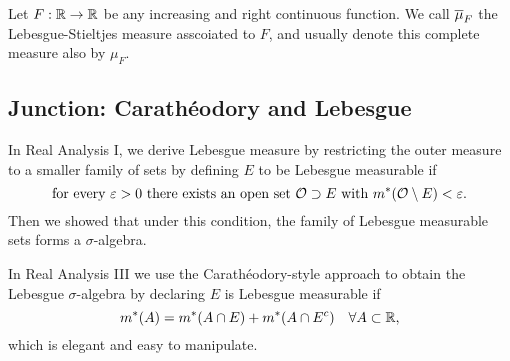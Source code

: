 \begin{definition}
    Let $F: \mathbb{R} \to \mathbb{R}$ be any increasing and right continuous function. We call $\overline{\mu}_F$ the Lebesgue-Stieltjes measure asscoiated to $F$, and usually denote this complete measure also by $\mu_F$. 
\end{definition}


\subsection{Junction: Carath\'eodory and Lebesgue}
In Real Analysis I, we derive Lebesgue measure by restricting the outer measure to a smaller family of sets by defining $E$ to be Lebesgue measurable if 
$$\text{for every }\varepsilon>0 \text{ there exists an open set }\mathcal{O} \supset E \text{ with }m^*(\mathcal{O} \setminus E) < \varepsilon.$$
Then we showed that under this condition, the family of Lebesgue measurable sets forms a $\sigma$-algebra. 

In Real Analysis III we use the Carath\'eodory-style approach to obtain the Lebesgue $\sigma$-algebra by declaring $E$ is Lebesgue measurable if 
$$m^*(A) = m^*(A \cap E) + m^*(A \cap E^c) \quad \forall A \subset \mathbb{R}, $$
which is elegant and easy to manipulate. 

